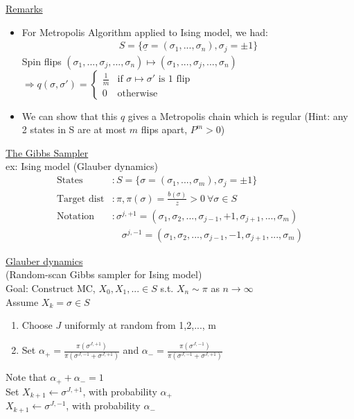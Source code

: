 \documentclass[12pt, letterpaper]{article}
\begin{document}
\underline{Remarks}
\begin{itemize}
    \item For Metropolis Algorithm applied to Ising model, we had: 
    \begin{align*}
        S = \{\underline{\sigma} = (\sigma_1, ..., \sigma_n), \sigma_j = \pm 1\}
    \end{align*}
    Spin flips $(\sigma_1,..., \sigma_j, ..., \sigma_n)\mapsto (\sigma_1,..., \sigma_j, ..., \sigma_n)$ \\
    $\Rightarrow q(\sigma, \sigma ') = \begin{cases}
        \frac 1m & \text{if } \sigma \mapsto \sigma' \text{ is 1 flip} \\ 
        0 & \text{otherwise}
    \end{cases}$ \\
    \item We can show that this $q$ gives a Metropolis chain which is regular
    (Hint: any 2 states in S are at most $m$ flips apart, $P^m > 0$)
\end{itemize}

\noindent\underline{The Gibbs Sampler} \\
ex: Ising model (Glauber dynamics) \\
\begin{align*}
    \text{States} &: S = \{\sigma = (\sigma_1,..., \sigma_m), \sigma_j = \pm 1\}\\
    \text{Target dist} &: \pi, \pi(\sigma) = \frac{b(\sigma)}{z}>0 \ \forall \sigma \in S \\
    \text{Notation} &: \sigma^{j, +1} = (\sigma_1, \sigma_2, ... , \sigma_{j-1}, +1, \sigma_{j+1},..., \sigma_m) \\
    &\quad \sigma^{j, -1} = (\sigma_1, \sigma_2, ... , \sigma_{j-1}, -1, \sigma_{j+1},..., \sigma_m)
\end{align*}

\noindent\underline{Glauber dynamics} \\
(Random-scan Gibbs sampler for Ising model)\\
Goal: Construct MC, $X_0, X_1,... \in S$ s.t. $X_n \sim \pi$ as $n\rightarrow \infty$ \\
Assume $X_k = \sigma \in S$
\begin{enumerate}
    \item Choose $J$ uniformly at random from 1,2,..., m 
    \item Set $\alpha_+ = \frac{\pi(\sigma^{J, +1})}{\pi(\sigma^{J, -1}+ \sigma^{J, +1})}$
    and $\alpha_- = \frac{\pi(\sigma^{J, -1})}{\pi(\sigma^{J, -1}+ \sigma^{J, +1})}$
\end{enumerate}
Note that $\alpha_+ + \alpha_-  = 1$ \\
Set $X_{k+1} \leftarrow \sigma^{J, +1}$, with probability $\alpha_+$ \\
$X_{k+1} \leftarrow \sigma^{J, -1}$, with probability $\alpha_-$ \\
\end{document}
